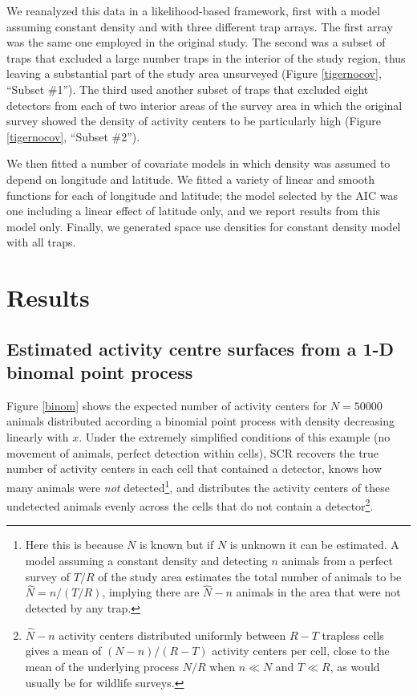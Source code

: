 \documentclass[a4paper,12pt]{article}
\begin{document}
We reanalyzed this data in a likelihood-based framework, first with a model assuming constant density and with three different trap arrays. The first array was the same one employed in the original study. The second was a subset of traps that excluded a large number traps in the interior of the study region, thus leaving a substantial part of the study area unsurveyed (Figure \ref{tigernocov}, ``Subset \#1''). The third used another subset of traps that excluded eight detectors from each of two interior areas of the survey area in which the original survey showed the density of activity centers to be particularly high (Figure \ref{tigernocov}, ``Subset \#2''). 

We then fitted a number of covariate models in which density was assumed to depend on longitude and latitude. We fitted a variety of linear and smooth functions for each of longitude and latitude; the model selected by the AIC was one including a linear effect of latitude only, and we report results from this model only. Finally, we generated space use densities for constant density model with all traps.

\section{Results}
\subsection{Estimated activity centre surfaces from a 1-D binomal point process}
Figure \ref{binom} shows the expected number of activity centers for $N=50000$ animals distributed according a binomial point process with density decreasing linearly with $x$. Under the extremely simplified conditions of this example (no movement of animals, perfect detection within cells), SCR recovers the true number of activity centers in each cell that contained a detector, knows how many animals were {\it not} detected\footnote{Here this is because $N$ is known but if $N$ is unknown it can be estimated. A model assuming a constant density and detecting $n$ animals from a perfect survey of $T/R$ of the study area estimates the total number of animals to be $\hat{N}=n/(T/R)$, implying there are $\hat{N}-n$ animals in the area that were not detected by any trap.}, and distributes the activity centers of these undetected animals evenly across the cells that do not contain a detector\footnote{$\hat{N}-n$ activity centers distributed uniformly between $R-T$ trapless cells gives a mean of $(N-n)/(R-T)$ activity centers per cell, close to the mean of the underlying process $N/R$ when $n\ll N$ and $T\ll R$, as would usually be for wildlife surveys.}. 
\end{document}
